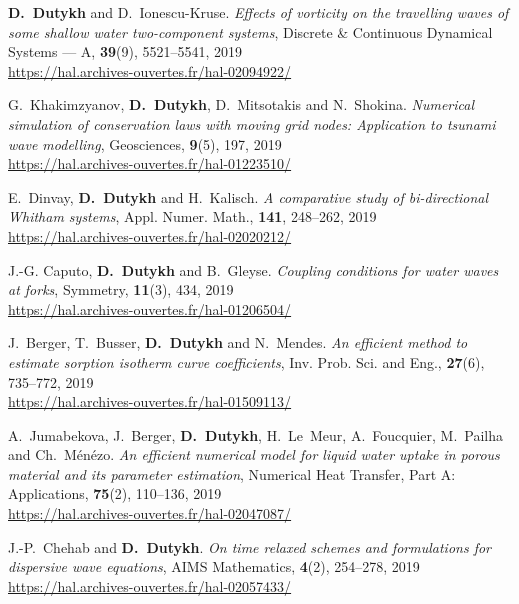 \begin{etaremune}
  \item \textbf{D.~Dutykh} and D.~Ionescu-Kruse. \textit{Effects of vorticity on the travelling waves of some shallow water two-component systems}, Discrete \& Continuous Dynamical Systems --- A, \textbf{39}(9), 5521--5541, 2019 \\ %
  \url{https://hal.archives-ouvertes.fr/hal-02094922/}
  
  \item G.~Khakimzyanov, \textbf{D.~Dutykh}, D.~Mitsotakis and N.~Shokina. \textit{Numerical simulation of conservation laws with moving grid nodes: Application to tsunami wave modelling}, Geosciences, \textbf{9}(5), 197, 2019 \\ %
  \url{https://hal.archives-ouvertes.fr/hal-01223510/}

  \item E.~Dinvay, \textbf{D.~Dutykh} and H.~Kalisch. \textit{A comparative study of bi-directional Whitham systems}, Appl. Numer. Math., \textbf{141}, 248--262, 2019 \\ %
  \url{https://hal.archives-ouvertes.fr/hal-02020212/}
  
  \item J.-G. Caputo, \textbf{D.~Dutykh} and B.~Gleyse. \textit{Coupling conditions for water waves at forks}, Symmetry, \textbf{11}(3), 434, 2019 \\ %
  \url{https://hal.archives-ouvertes.fr/hal-01206504/}
  
  \item J.~Berger, T.~Busser, \textbf{D.~Dutykh} and N.~Mendes. \textit{An efficient method to estimate sorption isotherm curve coefficients},  Inv. Prob. Sci. and Eng., \textbf{27}(6), 735--772, 2019 \\ %
  \url{https://hal.archives-ouvertes.fr/hal-01509113/}
  
  \item A.~Jumabekova, J.~Berger, \textbf{D.~Dutykh}, H.~Le~Meur, A.~Foucquier, M.~Pailha and Ch.~M\'en\'ezo. \textit{An efficient numerical model for liquid water uptake in porous material and its parameter estimation}, Numerical Heat Transfer, Part A: Applications, \textbf{75}(2), 110--136, 2019 \\ %
  \url{https://hal.archives-ouvertes.fr/hal-02047087/}
  
  \item J.-P.~Chehab and \textbf{D.~Dutykh}. \textit{On time relaxed schemes and formulations for dispersive wave equations}, AIMS Mathematics, \textbf{4}(2), 254--278, 2019 \\ %
  \url{https://hal.archives-ouvertes.fr/hal-02057433/}
  

\end{etaremune}
